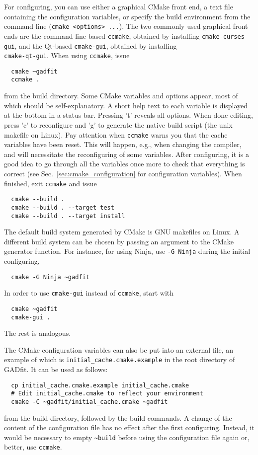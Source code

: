 \documentclass{article}
\begin{document}
For configuring, you can use either a graphical CMake front end, a text file containing the configuration variables, or specify the build environment from the command line (\verb+cmake <options> ...+). The two commonly used graphical front ends are the command line based \texttt{ccmake}, obtained by installing \texttt{cmake-curses-gui}, and the Qt-based \texttt{cmake-gui}, obtained by installing \\
\texttt{cmake-qt-gui}. When using \texttt{ccmake}, issue
\begin{verbatim}
  cmake ~gadfit
  ccmake .
\end{verbatim}
from the build directory. Some CMake variables and options appear, most of which should be self-explanatory. A short help text to each variable is displayed at the bottom in a status bar. Pressing 't' reveals all options. When done editing, press 'c' to reconfigure and 'g' to generate the native build script (the unix makefile on Linux). Pay attention when \texttt{ccmake} warns you that the cache variables have been reset. This will happen, e.g., when changing the compiler, and will necessitate the reconfiguring of some variables. After configuring, it is a good idea to go through all the variables once more to check that everything is correct (see Sec.~\ref{sec:cmake_configuration} for configuration variables). When finished, exit \texttt{ccmake} and issue
\begin{verbatim}
  cmake --build .
  cmake --build . --target test
  cmake --build . --target install
\end{verbatim}
The default build system generated by CMake is GNU makefiles on Linux. A different build system can be chosen by passing an argument to the CMake generator function. For instance, for using Ninja, use \texttt{-G Ninja} during the initial configuring,
\begin{verbatim}
  cmake -G Ninja ~gadfit
\end{verbatim}
In order to use \texttt{cmake-gui} instead of \texttt{ccmake}, start with
\begin{verbatim}
  cmake ~gadfit
  cmake-gui .
\end{verbatim}
The rest is analogous.

The CMake configuration variables can also be put into an external file, an example of which is \verb+initial_cache.cmake.example+ in the root directory of GADfit. It can be used as follows:
\begin{verbatim}
  cp initial_cache.cmake.example initial_cache.cmake
  # Edit initial_cache.cmake to reflect your environment
  cmake -C ~gadfit/initial_cache.cmake ~gadfit
\end{verbatim}
from the build directory, followed by the build commands. A change of the content of the configuration file has no effect after the first configuring. Instead, it would be necessary to empty \verb+~build+ before using the configuration file again or, better, use \texttt{ccmake}.
\end{document}
